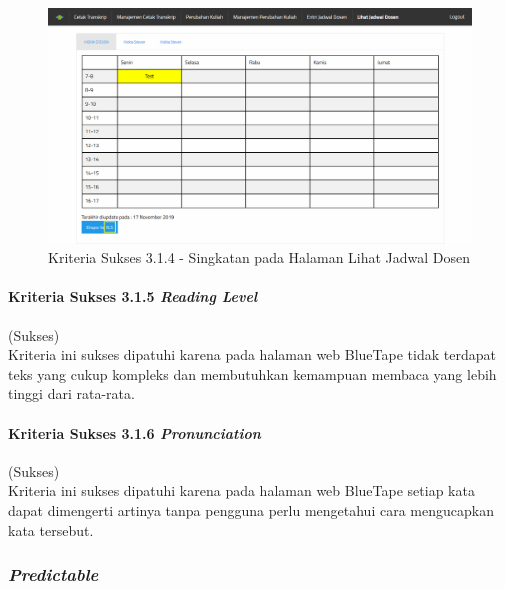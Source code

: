 \documentclass[a4paper,twoside]{article}
\begin{document}
\begin{enumerate}
\begin{itemize}
			\begin{figure}[H]
				\centering  
				\includegraphics[scale=0.3, frame]{kriteria-sukses-3-1-4-abbreviations-6}  
				\caption[Kriteria Sukses 3.1.4 - Singkatan pada Halaman Lihat Jadwal Dosen]{Kriteria Sukses 3.1.4 - Singkatan pada Halaman Lihat Jadwal Dosen}
				\label{fig:3.1.4_abbreviations_6}  
			\end{figure}
		\end{itemize}

		\paragraph{Kriteria Sukses 3.1.5 \textit{Reading Level}}
		\label{par:kepatuhan_bluetape_kriteria_sukses_3.1.5}
		(Sukses)\\

		Kriteria ini sukses dipatuhi karena pada halaman web BlueTape tidak terdapat teks yang cukup kompleks dan membutuhkan kemampuan membaca yang lebih tinggi dari rata-rata.

		\paragraph{Kriteria Sukses 3.1.6 \textit{Pronunciation}}
		\label{par:kepatuhan_bluetape_kriteria_sukses_3.1.6}
		(Sukses)\\

		Kriteria ini sukses dipatuhi karena pada halaman web BlueTape setiap kata dapat dimengerti artinya tanpa pengguna perlu mengetahui cara mengucapkan kata tersebut.

		\subsubsection*{\textit{Predictable}}
		\label{subsubsec:kepatuhan_bluetape_predictable}


\end{enumerate}
\end{document}
